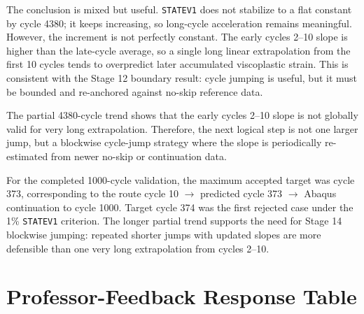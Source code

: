 \documentclass[11pt,a4paper]{article}
\begin{document}
The conclusion is mixed but useful. \texttt{STATEV1} does not stabilize to a flat constant by cycle 4380; it keeps increasing, so long-cycle acceleration remains meaningful. However, the increment is not perfectly constant. The early cycles 2--10 slope is higher than the late-cycle average, so a single long linear extrapolation from the first 10 cycles tends to overpredict later accumulated viscoplastic strain. This is consistent with the Stage 12 boundary result: cycle jumping is useful, but it must be bounded and re-anchored against no-skip reference data.

The partial 4380-cycle trend shows that the early cycles 2--10 slope is not globally valid for very long extrapolation. Therefore, the next logical step is not one larger jump, but a blockwise cycle-jump strategy where the slope is periodically re-estimated from newer no-skip or continuation data.

For the completed 1000-cycle validation, the maximum accepted target was cycle 373, corresponding to the route cycle 10 $\rightarrow$ predicted cycle 373 $\rightarrow$ Abaqus continuation to cycle 1000. Target cycle 374 was the first rejected case under the 1\% \texttt{STATEV1} criterion. The longer partial trend supports the need for Stage 14 blockwise jumping: repeated shorter jumps with updated slopes are more defensible than one very long extrapolation from cycles 2--10.

\section{Professor-Feedback Response Table}
\end{document}
